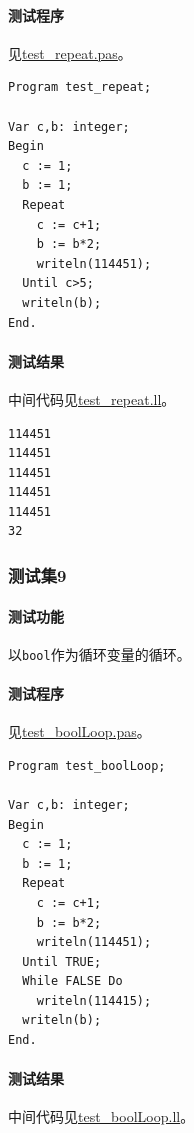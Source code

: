 \documentclass[lang=cn,11pt,a4paper,cite=authornum]{paper}
\begin{document}
\paragraph{测试程序} 见\href{run:../test/test_repeat.pas}{test\_repeat.pas}。

\begin{code}
\begin{verbatim}
Program test_repeat;

Var c,b: integer;
Begin
  c := 1;
  b := 1;
  Repeat
    c := c+1;
    b := b*2;
    writeln(114451);
  Until c>5;
  writeln(b);
End.
\end{verbatim}
\end{code}

\paragraph{测试结果} 中间代码见\href{run:../test/test_repeat.ll}{test\_repeat.ll}。

\begin{code}
\begin{verbatim}
114451
114451
114451
114451
114451
32
\end{verbatim}
\end{code}

\subsubsection{测试集9}

\paragraph{测试功能} 以\texttt{bool}作为循环变量的循环。

\paragraph{测试程序} 见\href{run:../test/test_boolLoop.pas}{test\_boolLoop.pas}。

\begin{code}
\begin{verbatim}
Program test_boolLoop;

Var c,b: integer;
Begin
  c := 1;
  b := 1;
  Repeat
    c := c+1;
    b := b*2;
    writeln(114451);
  Until TRUE;
  While FALSE Do
    writeln(114415);
  writeln(b);
End.
\end{verbatim}
\end{code}

\paragraph{测试结果} 中间代码见\href{run:../test/test_boolLoop.ll}{test\_boolLoop.ll}。
\end{document}
